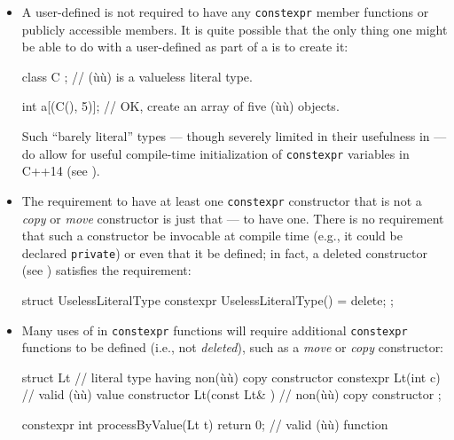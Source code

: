 \begin{itemize}
\item{A user-defined  is not required to have any \lstinline!constexpr! member functions or publicly accessible members. It is quite possible that the only thing one might be able to do with a user-defined  as part of a  is to create it:

\begin{emcppslisting}
class C { };  // (ù{}ù) is a valueless literal type.

int a[(C(), 5)];  // OK, create an array of five (ù{}ù) objects.
\end{emcppslisting}
    

Such ``barely literal'' types --- though severely limited in their
usefulness in  --- do allow for useful
compile-time initialization of \lstinline!constexpr! variables in C++14
(see ).}

\item{The requirement to have at least one \lstinline!constexpr! constructor that is not a \emph{copy} or \emph{move} constructor is just that — to have one. There is no requirement that such a constructor be invocable at compile time (e.g., it could be declared \lstinline!private!) or even that it be defined; in fact, a deleted constructor (see ) satisfies the requirement:

\begin{emcppslisting}
struct UselessLiteralType
{
    constexpr UselessLiteralType() = delete;
};
\end{emcppslisting}
}
    

\item{Many uses of  in \lstinline!constexpr! functions will require additional \lstinline!constexpr! functions to be defined (i.e., not \emph{deleted}), such as a \emph{move} or \emph{copy} constructor:

\begin{emcppslisting}
struct Lt  // literal type having non(ù{}ù) copy constructor
{
    constexpr Lt(int c) { }  // valid (ù{}ù) value constructor
    Lt(const Lt& ) { }       // non(ù{}ù) copy constructor
};

constexpr int processByValue(Lt t) { return 0; }  // valid (ù{}ù) function


\end{emcppslisting}}
\end{itemize}
